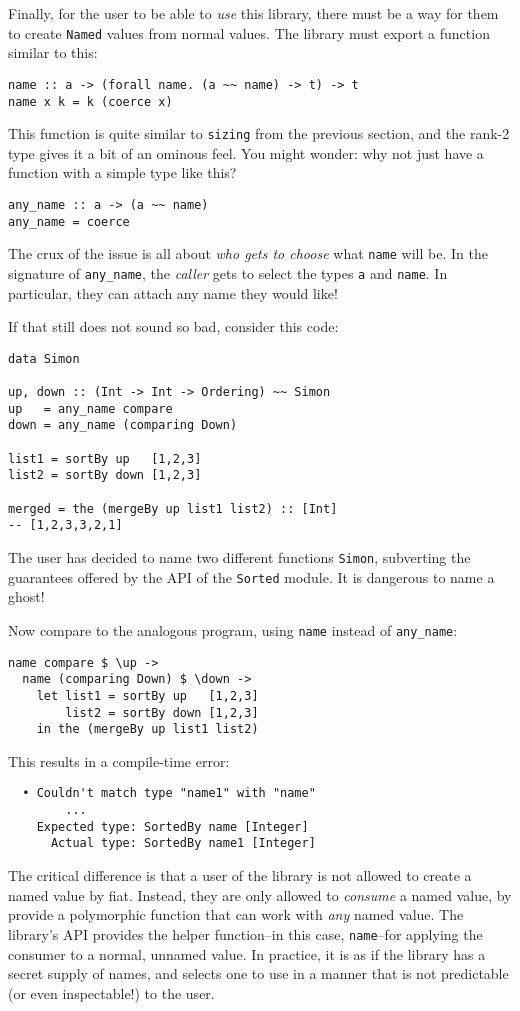 \documentclass[format=sigplan, review=false, screen=true]{acmart}
\begin{document}
Finally, for the user to be able to \emph{use} this library, there must be a way for
them to create \texttt{Named} values from normal values. The library must export a
function similar to this:

\begin{verbatim}
name :: a -> (forall name. (a ~~ name) -> t) -> t
name x k = k (coerce x)
\end{verbatim}

This function is quite similar to \texttt{sizing} from the previous section, and the rank-2
type gives it a bit of an ominous feel. You might wonder: why not just have a function
with a simple type like this?

\begin{verbatim}
any_name :: a -> (a ~~ name)
any_name = coerce
\end{verbatim}

The crux of the issue is all about \emph{who gets to choose} what \texttt{name} will be.
In the signature of \texttt{any\_name}, the \emph{caller} gets to select the types \texttt{a}
and \texttt{name}. In particular, they can attach any name they would like!

If that still does not sound so bad, consider this code:

\begin{verbatim}
data Simon
  
up, down :: (Int -> Int -> Ordering) ~~ Simon
up   = any_name compare
down = any_name (comparing Down)

list1 = sortBy up   [1,2,3]
list2 = sortBy down [1,2,3]

merged = the (mergeBy up list1 list2) :: [Int]
-- [1,2,3,3,2,1]
\end{verbatim}
\noindent
The user has decided to name two different functions \texttt{Simon}, subverting the
guarantees offered by the API of the \texttt{Sorted} module. It is dangerous to
name a ghost!

Now compare to the analogous program, using \texttt{name} instead of \texttt{any\_name}:
\begin{verbatim}
name compare $ \up ->
  name (comparing Down) $ \down ->
    let list1 = sortBy up   [1,2,3]
        list2 = sortBy down [1,2,3]
    in the (mergeBy up list1 list2)
\end{verbatim}
\noindent
This results in a compile-time error:

\begin{lstlisting}
  • Couldn't match type "name1" with "name"
        ...
    Expected type: SortedBy name [Integer]
      Actual type: SortedBy name1 [Integer]
\end{lstlisting}
\noindent
The critical difference is that a user of the library is not allowed to create a named
value by fiat. Instead, they are only allowed to \emph{consume} a named value, by
provide a polymorphic function that can work with \emph{any} named value. The library's API provides the helper function--in this case, \texttt{name}--for applying the consumer to a normal, unnamed value. In practice, it is as if the
library has a secret supply of names, and selects one to use in a manner that is not
predictable (or even inspectable!) to the user.
\end{document}
